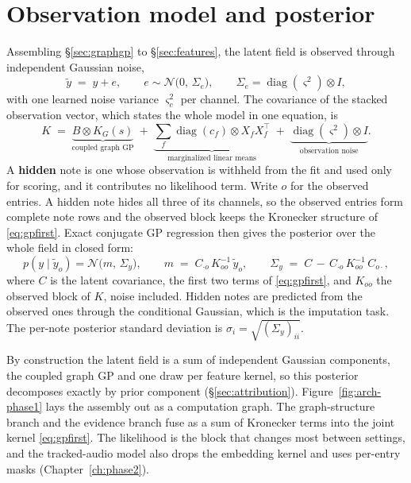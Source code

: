 \documentclass[11pt,a4paper]{report}
\newcommand{\N}{\mathcal{N}}
\newcommand{\Sy}{\Sigma_y}             %
\newcommand{\diag}{\operatorname{diag}}
\begin{document}
\section{Observation model and posterior}
\label{sec:gpfirst}
Assembling \S\ref{sec:graphgp} to \S\ref{sec:features}, the latent field is
observed through independent Gaussian noise,
\begin{equation}
  \tilde y \;=\; y + e, \qquad e \sim \N\bigl(0,\, \Sigma_e\bigr),
  \qquad \Sigma_e = \diag(\varsigma^2) \otimes I,
  \label{eq:obs}
\end{equation}
with one learned noise variance $\varsigma_c^2$ per channel. The covariance
of the stacked observation vector, which states the whole model in one
equation, is
\begin{equation}
K \;=\;
\underbrace{B \otimes K_G(s)}_{\text{coupled graph GP}}
\;+\; \underbrace{\sum_f \operatorname{diag}(c_f) \otimes X_f X_f^\top}_{\text{marginalized linear means}}
\;+\; \underbrace{\operatorname{diag}(\varsigma^2) \otimes I}_{\text{observation noise}} .
\label{eq:gpfirst}
\end{equation}
A \textbf{hidden} note is one whose observation is withheld from the fit and
used only for scoring, and it contributes no likelihood term. Write $o$ for
the observed entries. A hidden note hides all three of its channels, so the
observed entries form complete note rows and the observed block keeps the
Kronecker structure of \eqref{eq:gpfirst}. Exact conjugate GP regression
then gives the posterior over the whole field in closed form:
\begin{equation}
  p(y \mid \tilde y_o) = \N\bigl(m,\, \Sy\bigr), \qquad
  m \;=\; C_{\cdot o}\, K_{oo}^{-1}\, \tilde y_o, \qquad
  \Sy \;=\; C \,-\, C_{\cdot o}\, K_{oo}^{-1}\, C_{o \cdot},
  \label{eq:posterior}
\end{equation}
where $C$ is the latent covariance, the first two terms of
\eqref{eq:gpfirst}, and $K_{oo}$ the observed block of $K$, noise included.
Hidden notes are predicted from the observed ones through the conditional
Gaussian, which is the imputation task. The per-note posterior
standard deviation is $\sigma_i = \sqrt{(\Sy)_{ii}}$.

By construction the latent field is a sum of independent Gaussian
components, the coupled graph GP and one draw per feature kernel, so this
posterior decomposes exactly by prior component (\S\ref{sec:attribution}).
Figure~\ref{fig:arch-phase1} lays the assembly out as a computation graph.
The graph-structure branch and the evidence branch fuse as a sum of
Kronecker terms into the joint kernel \eqref{eq:gpfirst}. The likelihood is
the block that changes most between settings, and the tracked-audio model
also drops the embedding kernel and uses per-entry masks
(Chapter~\ref{ch:phase2}).
\end{document}
